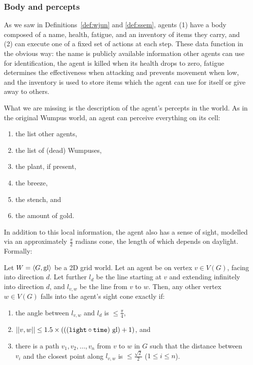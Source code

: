 \subsubsection{Body and percepts}

As we saw in Definitions~\ref{def:wjun} and \ref{def:ssem}, agents (1) have a body composed of a name, health, fatigue, and an inventory of items they carry, and (2) can execute one of a fixed set of actions at each step. These data function in the obvious way: the name is publicly available information other agents can use for identification, the agent is killed when its health drops to zero, fatigue determines the effectiveness when attacking and prevents movement when low, and the inventory is used to store items which the agent can use for itself or give away to others.

What we are missing is the description of the agent's percepts in the world. As in the original Wumpus world, an agent can perceive everything on its cell:
	\begin{enumerate}
		\item the list other agents,
		\item the list of (dead) Wumpuses,
		\item the plant, if present,
		\item the breeze,
		\item the stench, and
		\item the amount of gold.
	\end{enumerate}
	
In addition to this local information, the agent also has a sense of sight, modelled via an approximately $\frac{\pi}{2}$ radians cone, the length of which depends on daylight. Formally:

\begin{definition}
	\label{def:los}
	Let $W = \langle G, \mathrm{gl} \rangle$ be a 2D grid world. Let an agent be on vertex $v \in V(G)$, facing into direction $d$. Let further $l_d$ be the line starting at $v$ and extending infinitely into direction $d$, and $l_{v,w}$ be the line from $v$ to $w$. Then, any other vertex $w \in V(G)$ falls into the agent's sight cone exactly if:
	
	\begin{enumerate}
		\item the angle between $l_{v,w}$ and $l_d$ is $\leq \frac{\pi}{4}$,
		\item $||{v},{w}|| \leq 1.5 \times (((\mathtt{light} \circ \mathtt{time})\ \mathrm{gl}) + 1)$, and
		\item there is a path $v_1, v_2, \dots, v_n$ from $v$ to $w$ in $G$ such that
		the distance between $v_i$ and the closest point along $l_{v,w}$ is $\leq \frac{\sqrt{2}}{2}$ ($1 \leq i \leq n$).
	\end{enumerate}
\end{definition}

